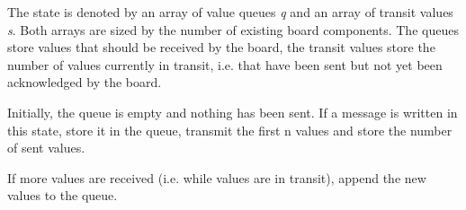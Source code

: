 \documentclass{report}
\begin{document}
The state is denoted by an array of value queues \textit{q} and an array of transit values \textit{s}. Both arrays are sized by the number of existing board components. The queues store values that should be received by the board, the transit values store the number of values currently in transit, i.e. that have been sent but not yet been acknowledged by the board.

\begin{mathpar}
\end{mathpar}
Initially, the queue is empty and nothing has been sent. If a message is written in this state, store it in the queue, transmit the first n values and store the number of sent values.


\begin{mathpar}
\end{mathpar}
If more values are received (i.e. while values are in transit), append the new values to the queue.

\end{document}
